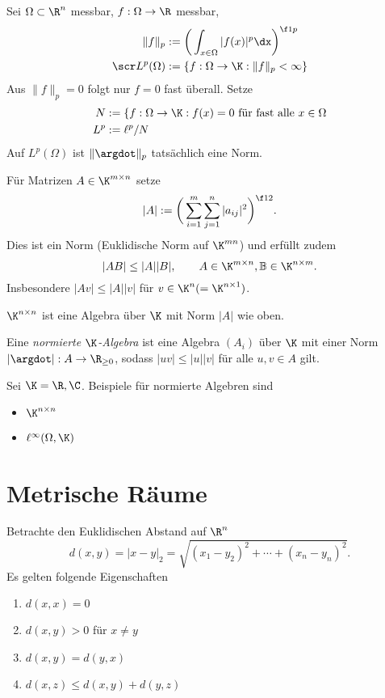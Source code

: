 \begin{ex}
	Sei $\Omega \subset \R^n$ messbar, $f : \Omega \to \R$ messbar,
	\begin{align*}
		\|f\|_p &:= \bigg( \int_{x\in \Omega} |f(x)|^p \dx \bigg)^{\f 1p} \\
		\scr L^p(\Omega) &:= \{ f: \Omega \to \K : \|f\|_p < \infty \}
	\end{align*}
	Aus $\|f\|_p = 0$ folgt nur $f=0$ fast überall.
	Setze
	\begin{align*}
		N &:= \{ f : \Omega \to \K : f(x) = 0 \text{ für fast alle $x\in\Omega$} \\
		L^p &:= \ell^p / N
	\end{align*}
	Auf $L^p(\Omega)$ ist $\|\argdot\|_p$ tatsächlich eine Norm.
\end{ex}

\begin{ex}
	Für Matrizen $A \in \K^{m\times n}$ setze
	\[
		|A| := \bigg( \sum_{i=1}^m \sum_{j=1}^n |a_{ij}|^2 \bigg)^{\f 12}.
	\]
	Dies ist ein Norm (Euklidische Norm auf $\K^{mn}$) und erfüllt zudem
	\[
		|A B | \le |A| |B|,
		\qquad A \in \K^{m\times n}, \B \in \K^{n\times m}.
	\]
	Insbesondere $|Av| \le |A| |v|$ für $v\in \K^n (= \K^{n\times 1})$.
\end{ex}

\begin{ex}
	$\K^{n\times n}$ ist eine Algebra über $\K$ mit Norm $|A|$ wie oben.
\end{ex}

\begin{df}
	Eine \emph{normierte $\K$-Algebra} ist eine Algebra $(A_i)$ über $\K$ mit einer Norm $|\argdot|: A \to \R_{\ge 0}$, sodass $|uv| \le |u||v|$ für alle $u,v \in A$ gilt.
\end{df}

\begin{ex}
	Sei $\K = \R, \C$.
	Beispiele für normierte Algebren sind
	\begin{itemize}
		\item
			$\K^{n\times n}$
		\item
			$\ell^\infty(\Omega, \K)$
	\end{itemize}
\end{ex}


\section{Metrische Räume}


\begin{ex}
	Betrachte den Euklidischen Abstand auf $\R^n$
	\[
		d(x,y) = |x-y|_2 = \sqrt{ (x_1 - y_2)^2  + \dotsb + (x_n - y_n)^2 }.
	\]
	Es gelten folgende Eigenschaften
	\begin{enumerate}[({M}1),start=0]
		\item
			$d(x,x) = 0$
		\item
			$d(x,y) > 0$ für $x\neq y$
		\item
			$d(x,y) = d(y,x)$
		\item
			$d(x,z) \le d(x,y) + d(y,z)$
	\end{enumerate}
\end{ex}

